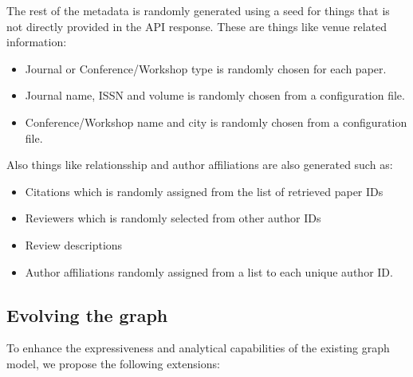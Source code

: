 \documentclass{article}
\begin{document}
The rest of the metadata is randomly generated using a seed for things that is not directly provided in the API response.
These are things like venue related information:
\begin{itemize}
    \item Journal or Conference/Workshop type is randomly chosen for each paper.
    \item Journal name, ISSN and volume is randomly chosen from a configuration file.
    \item Conference/Workshop name and city is randomly chosen from a configuration file.
\end{itemize}

Also things like relationsship and author affiliations are also generated such as:
\begin{itemize}
    \item Citations which is randomly assigned from the list of retrieved paper IDs
    \item Reviewers which is randomly selected from other author IDs
    \item Review descriptions
    \item Author affiliations randomly assigned from a list to each unique author ID. 
\end{itemize}


\subsection{Evolving the graph}

To enhance the expressiveness and analytical capabilities of the existing graph model, we propose the following extensions:
\end{document}
